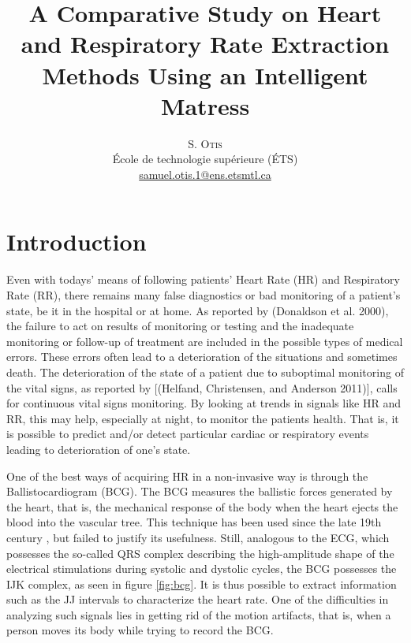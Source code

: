 \documentclass[twoside,twocolumn]{article}
\title{A Comparative Study on Heart and Respiratory Rate Extraction Methods Using an Intelligent Matress } %
\author{%
\textsc{S. Otis}\\[1ex]%
\normalsize École de technologie supérieure (ÉTS) \\ %
\normalsize \href{mailto:samuel.otis.1@ens.etsmtl.ca}{samuel.otis.1@ens.etsmtl.ca}
}
\begin{document}

\maketitle
\section{Introduction}
\label{section:Introduction}
	Even with todays' means of following patients' Heart Rate (HR) and Respiratory Rate (RR), there remains many false diagnostics or bad monitoring of a patient's state, be it in the hospital or at home. As reported by (Donaldson et al. 2000), the failure to act on results of monitoring or testing and the inadequate monitoring or follow-up of treatment are included in the possible types of medical errors. These errors often lead to a deterioration of the situations and sometimes death. The deterioration of the state of a patient due to suboptimal monitoring of the vital signs, as reported by [(Helfand, Christensen, and Anderson 2011)], calls for continuous vital signs monitoring. By looking at trends in signals like HR and RR, this may help, especially at night, to monitor the patients health. That is, it is possible to predict and/or detect particular cardiac or respiratory events leading to deterioration of one's state.
	
	One of the best ways of acquiring HR in a non-invasive way is through the Ballistocardiogram (BCG). The BCG measures the ballistic forces generated by the heart, that is, the mechanical response of the body when the heart ejects the blood into the vascular tree. This technique has been used since the late 19th century \cite{gordon_certain_1877}, but failed to justify its usefulness. 
	Still, analogous to the ECG, which possesses the so-called QRS complex describing the high-amplitude shape of the electrical stimulations during systolic and dystolic cycles, the BCG possesses the IJK complex, as seen in figure \ref{fig:bcg}. It is thus possible to extract information such as the JJ intervals to characterize the heart rate. 
	One of the difficulties in analyzing such signals lies in getting rid of the motion artifacts, that is, when a person moves its body while trying to record the BCG. 
	
\end{document}

